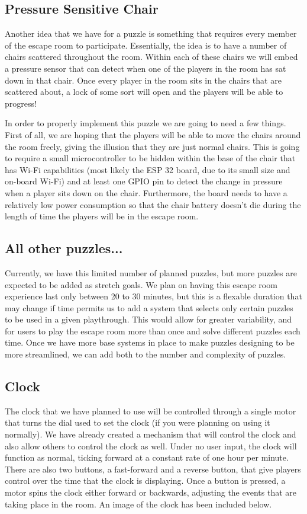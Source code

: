 \documentclass[conference]{IEEEtran}
\begin{document}
\subsection{Pressure Sensitive Chair}
Another idea that we have for a puzzle is something that requires every member of the escape room to participate.
Essentially, the idea is to have a number of chairs scattered throughout the room. Within each of these chairs
we will embed a pressure sensor that can detect when one of the players in the room has sat down in that chair.
Once every player in the room sits in the chairs that are scattered about, a lock of some sort will open and the
players will be able to progress!

In order to properly implement this puzzle we are going to need a few things. First of all, we are hoping that the
players will be able to move the chairs around the room freely, giving the illusion that they are just normal chairs.
This is going to require a small microcontroller to be hidden within the base of the chair that has Wi-Fi capabilities
(most likely the ESP 32 board, due to its small size and on-board Wi-Fi) and at least one GPIO pin to detect the change
in pressure when a player sits down on the chair. Furthermore, the board needs to have a relatively low power consumption
so that the chair battery doesn't die during the length of time the players will be in the escape room.

\subsection{All other puzzles...}
Currently, we have this limited number of planned puzzles, but more puzzles are expected to be added
as stretch goals. We plan on having this escape room experience last only between 20 to 30 minutes,
but this is a flexable duration that may change if time permits us to add a system that selects
only certain puzzles to be used in a given playthrough. This would allow for greater variability,
and for users to play the escape room more than once and solve different puzzles each time.
Once we have more base systems in place to make puzzles designing to be more streamlined, we can add
both to the number and complexity of puzzles.

\subsection*{Clock}
The clock that we have planned to use will be controlled through a single motor that turns the
dial used to set the clock (if you were planning on using it normally). We have already created
a mechanism that will control the clock and also allow others to control the clock as well. Under
no user input, the clock will function as normal, ticking forward at a constant rate of one hour per
minute. There are also two buttons, a fast-forward and a reverse button, that give players control
over the time that the clock is displaying. Once a button is pressed, a motor spins the clock
either forward or backwards, adjusting the events that are taking place in the room. An image of
the clock has been included below.
\end{document}
